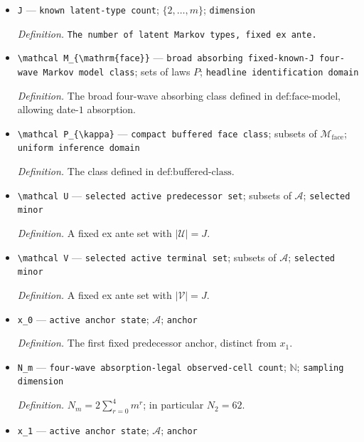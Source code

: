 \documentclass{article}
\begin{document}
\begin{itemize}
  \item \texttt{J} --- \texttt{known latent-\allowbreak{}type count}; \(\{2,\ldots,m\}\); \texttt{dimension}
  \par\smallskip\noindent\emph{Definition.} \texttt{The number of latent Markov types,\allowbreak{} fixed ex ante.}
  \item \texttt{\textbackslash{}\allowbreak{}mathcal M\_\allowbreak{}\{\textbackslash{}\allowbreak{}mathrm\{face\}\allowbreak{}\}\allowbreak{}} --- \texttt{broad absorbing fixed-\allowbreak{}known-\allowbreak{}J four-\allowbreak{}wave Markov model class}; sets of laws \(P\); \texttt{headline identification domain}
  \par\smallskip\noindent\emph{Definition.} The broad four-wave absorbing class defined in \(\text{def:face-model}\), allowing date-\(1\) absorption.
  \item \texttt{\textbackslash{}\allowbreak{}mathcal P\_\allowbreak{}\{\textbackslash{}\allowbreak{}kappa\}\allowbreak{}} --- \texttt{compact buffered face class}; subsets of \(\mathcal M_{\mathrm{face}}\); \texttt{uniform inference domain}
  \par\smallskip\noindent\emph{Definition.} The class defined in \(\text{def:buffered-class}\).
  \item \texttt{\textbackslash{}\allowbreak{}mathcal U} --- \texttt{selected active predecessor set}; subsets of \(\mathcal A\); \texttt{selected minor}
  \par\smallskip\noindent\emph{Definition.} A fixed ex ante set with \(|\mathcal U|=J\).
  \item \texttt{\textbackslash{}\allowbreak{}mathcal V} --- \texttt{selected active terminal set}; subsets of \(\mathcal A\); \texttt{selected minor}
  \par\smallskip\noindent\emph{Definition.} A fixed ex ante set with \(|\mathcal V|=J\).
  \item \texttt{x\_\allowbreak{}0} --- \texttt{active anchor state}; \(\mathcal A\); \texttt{anchor}
  \par\smallskip\noindent\emph{Definition.} The first fixed predecessor anchor, distinct from \(x_1\).
  \item \texttt{N\_\allowbreak{}m} --- \texttt{four-\allowbreak{}wave absorption-\allowbreak{}legal observed-\allowbreak{}cell count}; \(\mathbb N\); \texttt{sampling dimension}
  \par\smallskip\noindent\emph{Definition.} \(N_m=2\sum_{r=0}^{4}m^r\); in particular \(N_2=62\).
  \item \texttt{x\_\allowbreak{}1} --- \texttt{active anchor state}; \(\mathcal A\); \texttt{anchor}

\end{itemize}
\end{document}
